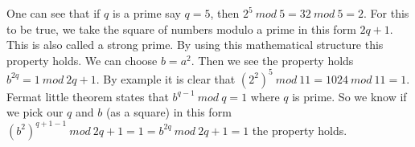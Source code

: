 \begin{description}
    \noindent
    One can see that if \begin{math}q\end{math} is a prime say \begin{math}q=5\end{math}, then \begin{math}2^5 \ mod \ 5 = 32 \ mod \ 5 = 2\end{math}. For this to be true, we take the square of numbers modulo a prime in this form \begin{math}2q+1\end{math}. This is also called a strong prime. By using this mathematical structure this property holds. We can choose \begin{math}b=a^2\end{math}. Then we see the property holds \begin{math}b^{2q} = 1 \ mod \ 2q+1\end{math}. By example it is clear that \begin{math}(2^2)^5 \ mod \ 11 = 1024 \ mod \ 11 = 1\end{math}. Fermat little theorem states that \begin{math}b^{q-1} \ mod \ q = 1\end{math} where \begin{math}q\end{math} is prime. So we know if we pick our \begin{math}q\end{math} and \begin{math}b\end{math} (as a square)  in this form \begin{math}(b^{2})^{q+1-1} \ mod \ 2q+1 =1 =  b^{2q} \ mod \ 2q+1 =1\end{math} the property holds.
\end{description}




\noindent

